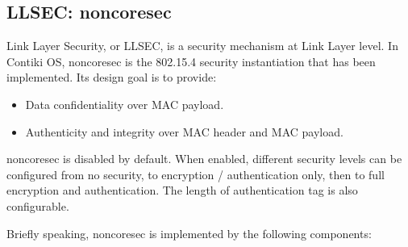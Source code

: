 \subsection{LLSEC: noncoresec}
Link Layer Security, or LLSEC, is a security mechanism at Link Layer level. In Contiki OS, noncoresec is the 802.15.4 security instantiation that has been implemented. Its design goal is to provide:
\begin{itemize}
\item Data confidentiality over MAC payload.
\item Authenticity and integrity over MAC header and MAC payload.
\end{itemize}

noncoresec is disabled by default. When enabled, different security levels can be configured from no security, to encryption / authentication only, then to full encryption and authentication. The length of authentication tag is also configurable.

Briefly speaking, noncoresec is implemented by the following components:

